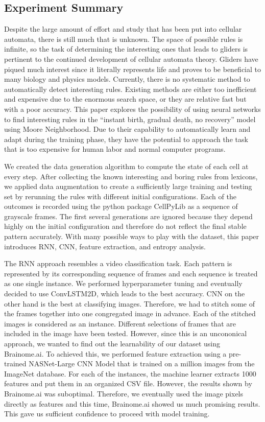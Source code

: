 \documentclass[12pt]{article}
\numberwithin{figure}{section} %
\begin{document}
\subsection{Experiment Summary}
Despite the large amount of effort and study that has been put into cellular automata, there is still much that is unknown. The space of possible rules is infinite, so the task of determining the interesting ones that leads to gliders is pertinent to the continued development of cellular automata theory. Gliders have piqued much interest since it literally represents life and proves to be beneficial to many biology and physics models. Currently, there is no systematic method to automatically detect interesting rules. Existing methods are either too inefficient and expensive due to the enormous search space, or they are relative fast but with a poor accuracy. This paper explores the possibility of using neural networks to find interesting rules in the “instant birth, gradual death, no recovery” model using Moore Neighborhood. Due to their capability to automatically learn and adapt during the training phase, they have the potential to approach the task that is too expensive for human labor and normal computer programs. 

We created the data generation algorithm to compute the state of each cell at every step. After collecting the known interesting and boring rules from lexicons, we applied data augmentation to create a sufficiently large training and testing set by rerunning the rules with different initial configurations. Each of the outcomes is recorded using the python package CellPyLib as a sequence of grayscale frames. The first several generations are ignored because they depend highly on the initial configuration and therefore do not reflect the final stable pattern accurately. With many possible ways to play with the dataset, this paper introduces RNN, CNN, feature extraction, and entropy analysis. 

The RNN approach resembles a video classification task. Each pattern is represented by its corresponding sequence of frames and each sequence is treated as one single instance. We performed hyperparameter tuning and eventually decided to use ConvLSTM2D, which leads to the best accuracy. CNN on the other hand is the best at classifying images. Therefore, we had to stitch some of the frames together into one congregated image in advance. Each of the stitched images is considered as an instance. Different selections of frames that are included in the image have been tested. However, since this is an uncononical approach, we wanted to find out the learnability of our dataset using Brainome.ai. To achieved this, we performed feature extraction using a pre-trained NASNet-Large CNN Model that is trained on a million images from the ImageNet database. For each of the instances, the machine learner extracts 1000 features and put them in an organized CSV file. However, the results shown by Brainome.ai was suboptimal. Therefore, we eventually used the image pixels directly as features and this time, Brainome.ai showed us much promising results. This gave us sufficient confidence to proceed with model training. 
\end{document}
